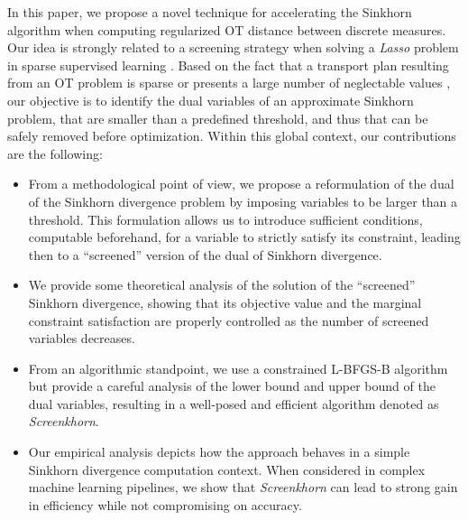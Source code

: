 {In this paper, we propose a novel technique for accelerating the Sinkhorn algorithm when computing regularized OT distance between discrete measures. Our idea
is strongly related to a screening strategy when solving a \emph{Lasso}
problem in sparse supervised learning \citep{Ghaoui2010SafeFE}. Based on the fact
that a  transport plan resulting from an OT problem is sparse or presents a large
number of neglectable values \citep{blondel2018ICML}, our objective is to identify the  dual variables of an approximate Sinkhorn problem, that are smaller than a predefined threshold, and thus that can be safely removed before optimization.  
Within this global context, our contributions are the following:
\begin{itemize}
	  \setlength\itemsep{-0.1cm}
	
	\item From a methodological point of view, we propose a reformulation of the dual of the Sinkhorn divergence problem by imposing variables to be larger than a threshold.
	This formulation allows us to introduce sufficient conditions, computable beforehand, for a variable to  strictly satisfy its constraint, leading then to
	a ``screened'' version of the dual of Sinkhorn divergence. 
	\item We provide some theoretical analysis of the solution of the ``screened''  Sinkhorn divergence, showing that its objective value and the marginal constraint satisfaction are properly controlled 	as the number of screened variables decreases.
	\item From an algorithmic standpoint, we use a constrained L-BFGS-B algorithm \citep{nocedal1980,byrd1995L-BFGS-B} but provide a careful analysis of the lower bound and upper bound of the dual	variables, resulting in a well-posed and efficient algorithm denoted as \emph{Screenkhorn}.
	\item Our empirical analysis depicts how the approach behaves in a simple Sinkhorn divergence computation context. When considered in  complex machine learning
	pipelines, we show that \emph{Screenkhorn} can lead to strong gain in efficiency
	while not compromising on accuracy.
\end{itemize}}
%	
%

